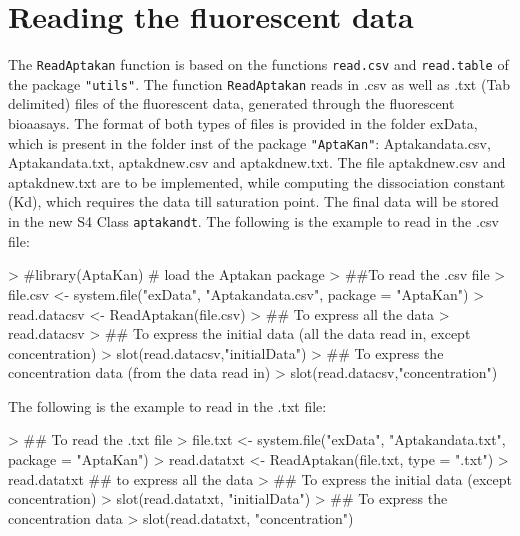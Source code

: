 \documentclass[11pt]{article}
\newcommand{\code}[1]{{\tt #1}}
\newcommand{\pkg}[1]{{\tt "#1"}}
\begin{document}
\section{Reading the fluorescent data}
The \code{ReadAptakan} function is based on the functions \code{read.csv} and \code{read.table} of the package \pkg{utils}. The function \code{ReadAptakan} reads in .csv as well as
.txt (Tab delimited) files of the fluorescent data, generated through the fluorescent
bioaasays. The format of both types of files is provided in the folder exData, which is
present in the folder inst of the package \pkg{AptaKan}: Aptakandata.csv, Aptakandata.txt,
aptakdnew.csv and aptakdnew.txt. The file aptakdnew.csv and aptakdnew.txt are to be implemented,
while computing the dissociation constant (Kd), which requires the data till saturation point.
The final data will be stored in the new S4 Class \code{aptakandt}. The following is the example
to read in the .csv file:

\begin{Schunk}
\begin{Sinput}
> #library(AptaKan) # load the Aptakan package
> ##To read the .csv file
> file.csv <- system.file("exData", "Aptakandata.csv", package = "AptaKan")
> read.datacsv <- ReadAptakan(file.csv)
> ## To express all the data
> read.datacsv
> ## To express the initial data (all the data read in, except concentration)
> slot(read.datacsv,"initialData")
> ## To express the concentration data (from the data read in)
> slot(read.datacsv,"concentration")
\end{Sinput}
\end{Schunk}

The following is the example to read in the .txt file:
\begin{Schunk}
\begin{Sinput}
> ## To read the .txt file
> file.txt <- system.file("exData", "Aptakandata.txt", package = "AptaKan")
> read.datatxt <- ReadAptakan(file.txt, type = ".txt")
> read.datatxt ## to express all the data
> ## To express the initial data (except concentration)
> slot(read.datatxt, "initialData")
> ## To express the concentration data
> slot(read.datatxt, "concentration")
\end{Sinput}
\end{Schunk}

\end{document}
